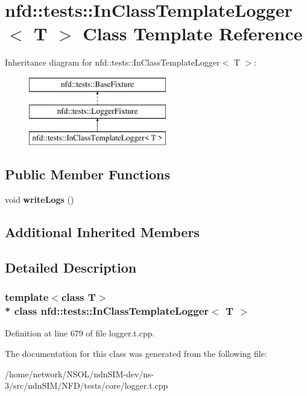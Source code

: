 \hypertarget{classnfd_1_1tests_1_1InClassTemplateLogger}{}\section{nfd\+:\+:tests\+:\+:In\+Class\+Template\+Logger$<$ T $>$ Class Template Reference}
\label{classnfd_1_1tests_1_1InClassTemplateLogger}
Inheritance diagram for nfd\+:\+:tests\+:\+:In\+Class\+Template\+Logger$<$ T $>$\+:\begin{figure}[H]
\begin{center}
\leavevmode
\includegraphics[height=3.000000cm]{classnfd_1_1tests_1_1InClassTemplateLogger}
\end{center}
\end{figure}
\subsection*{Public Member Functions}
\begin{DoxyCompactItemize}
\item 
void {\bfseries write\+Logs} ()\hypertarget{classnfd_1_1tests_1_1InClassTemplateLogger_a54776585289d8347c99b74257be766ce}{}\label{classnfd_1_1tests_1_1InClassTemplateLogger_a54776585289d8347c99b74257be766ce}

\end{DoxyCompactItemize}
\subsection*{Additional Inherited Members}


\subsection{Detailed Description}
\subsubsection*{template$<$class T$>$\\*
class nfd\+::tests\+::\+In\+Class\+Template\+Logger$<$ T $>$}



Definition at line 679 of file logger.\+t.\+cpp.



The documentation for this class was generated from the following file\+:\begin{DoxyCompactItemize}
\item 
/home/network/\+N\+S\+O\+L/ndn\+S\+I\+M-\/dev/ns-\/3/src/ndn\+S\+I\+M/\+N\+F\+D/tests/core/logger.\+t.\+cpp\end{DoxyCompactItemize}
